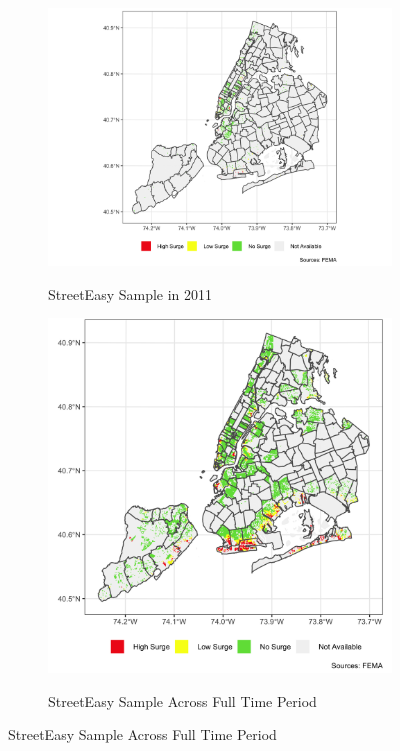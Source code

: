 \documentclass[12pt]{article}
\begin{document}
{{{{{{\begin{figure}[h!]
\caption{Dispersion of StreetEasy Sample over Time}
\begin{center}
\begin{subfigure}[b]{0.78\textwidth}
\caption{StreetEasy Sample in 2011}
\includegraphics[scale = 0.17]{Samples/maps_zipcodestreet11.png}
\label{fig:2011sesample}
\end{subfigure}
\hfill
\begin{subfigure}[b]{0.5\textwidth}
\caption{StreetEasy Sample Across Full Time Period}
\includegraphics[scale = 0.17]{Samples/maps_zipcodestreet.png}
\label{fig:fullsesample}
\end{subfigure}
\end{center}
\end{figure}

}}}}}}
\end{document}
